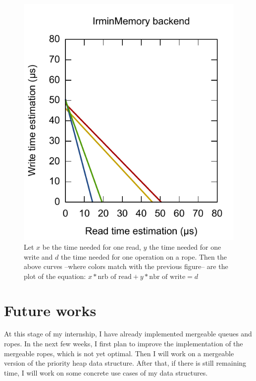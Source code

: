 \documentclass{article}
\newcommand{\ocaml}{OCaml\xspace}
\begin{document}
\begin{figure}[hbt]
\includegraphics[scale=0.6]{images/mem_interp.pdf}
\caption{Let $x$ be the time needed for one read, $y$ the time needed for one write and $d$ the time needed for one operation on a rope. Then the above curves --where colors match with the previous figure-- are the plot of the equation: $x * \mbox{nrb of read} + y * \mbox{nbr of write} = d$}
\label{interpolation}
\end{figure}

\FloatBarrier

\section{Future works}

At this stage of my internship, I have already implemented mergeable queues and ropes.
In the next few weeks, I first plan to improve the implementation of the mergeable ropes, which is not yet optimal.
Then I will work on a mergeable version of the priority heap data structure.
After that, if there is still remaining time, I will work on some concrete use cases of my data structures.
\end{document}
